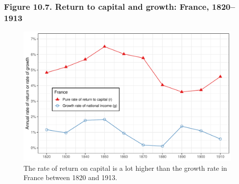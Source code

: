 \documentclass[t]{beamer}\usepackage[]{graphicx}\usepackage[]{color}
\newenvironment{knitrout}{}{} %
\begin{document}
\begin{frame}[label=Figure_10_7]
\frametitle{Figure 10.7. Return to capital and growth: France, 1820--1913}
\begin{figure}[t]
\begin{minipage}[b]{\textwidth}
\centering
\begin{knitrout}\footnotesize
{}\color{fgcolor}

{\centering \includegraphics[width=1\linewidth]{figures/color/Figure_10_7} 

}



\end{knitrout}
\caption{The rate of return on capital is a lot higher than the growth rate in France between 1820 and 1913.}
\end{minipage}
\end{figure}
\end{frame}
\end{document}
